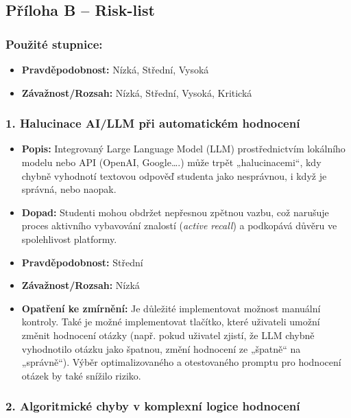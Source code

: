 \documentclass{vskpou} %
\begin{document}
\clearpage
\subsection{Příloha B -- Risk-list}

\subsubsection*{Použité stupnice:}

\begin{itemize}
    \item \textbf{Pravděpodobnost:} Nízká, Střední, Vysoká
    \item \textbf{Závažnost/Rozsah:} Nízká, Střední, Vysoká, Kritická
\end{itemize}

\subsubsection*{1. Halucinace AI/LLM při automatickém hodnocení}

\begin{itemize}
    \item \textbf{Popis:} Integrovaný Large Language Model (LLM) prostřednictvím lokálního modelu nebo API (OpenAI, Google….) může trpět „halucinacemi“, kdy chybně vyhodnotí textovou odpověď studenta jako nesprávnou, i když je správná, nebo naopak.
    \item \textbf{Dopad:} Studenti mohou obdržet nepřesnou zpětnou vazbu, což narušuje proces aktivního vybavování znalostí (\textit{active recall}) a podkopává důvěru ve spolehlivost platformy.
    \item \textbf{Pravděpodobnost:} Střední
    \item \textbf{Závažnost/Rozsah:} Nízká
    \item \textbf{Opatření ke zmírnění:} Je důležité implementovat možnost manuální kontroly. Také je možné implementovat tlačítko, které uživateli umožní změnit hodnocení otázky (např. pokud uživatel zjistí, že LLM chybně vyhodnotilo otázku jako špatnou, změní hodnocení ze „špatně“ na „správně“). Výběr optimalizovaného a otestovaného promptu pro hodnocení otázek by také snížilo riziko.
\end{itemize}

\subsubsection*{2. Algoritmické chyby v komplexní logice hodnocení}
\end{document}
